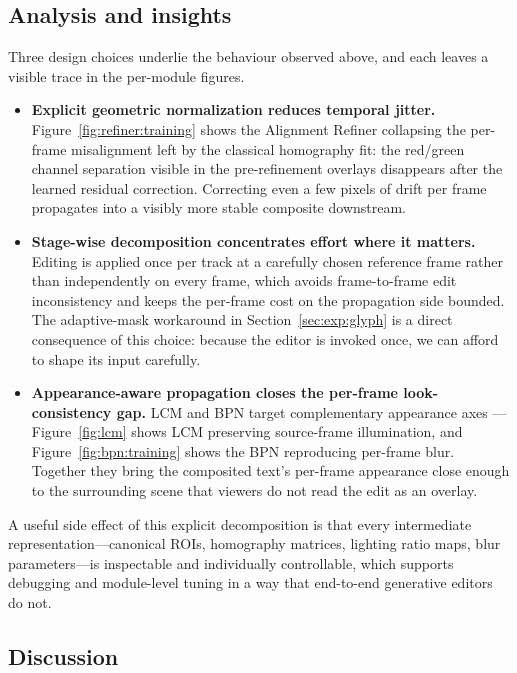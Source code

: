 \subsection{Analysis and insights}
\label{sec:exp:analysis}

Three design choices underlie the behaviour observed above, and
each leaves a visible trace in the per-module figures.

\begin{itemize}[leftmargin=*]
  \item \textbf{Explicit geometric normalization reduces temporal
    jitter.} Figure~\ref{fig:refiner:training} shows the Alignment
    Refiner collapsing the per-frame misalignment left by the
    classical homography fit: the red/green channel separation
    visible in the pre-refinement overlays disappears after the
    learned residual correction. Correcting even a few pixels of
    drift per frame propagates into a visibly more stable
    composite downstream.
  \item \textbf{Stage-wise decomposition concentrates effort
    where it matters.} Editing is applied once per track at a
    carefully chosen reference frame rather than independently on
    every frame, which avoids frame-to-frame edit inconsistency
    and keeps the per-frame cost on the propagation side bounded.
    The adaptive-mask workaround in
    Section~\ref{sec:exp:glyph} is a direct consequence of this
    choice: because the editor is invoked once, we can afford to
    shape its input carefully.
  \item \textbf{Appearance-aware propagation closes the
    per-frame look-consistency gap.} LCM and BPN target
    complementary appearance axes ---
    Figure~\ref{fig:lcm} shows LCM preserving source-frame
    illumination, and Figure~\ref{fig:bpn:training} shows the BPN
    reproducing per-frame blur. Together they bring the composited
    text's per-frame appearance close enough to the surrounding
    scene that viewers do not read the edit as an overlay.
\end{itemize}

A useful side effect of this explicit decomposition is that every
intermediate representation---canonical ROIs, homography
matrices, lighting ratio maps, blur parameters---is inspectable
and individually controllable, which supports debugging and
module-level tuning in a way that end-to-end generative editors
do not.

\subsection{Discussion}
\label{sec:exp:discussion}

